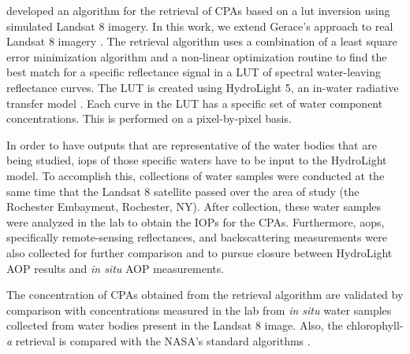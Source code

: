 \citet{Gerace:2013} developed an algorithm for the retrieval of CPAs based on a \acrfull{lut} inversion using simulated Landsat 8 imagery. In this work, we extend Gerace's approach to real Landsat 8 imagery \citep{Concha2013IGARSS}. The retrieval algorithm uses a combination of a least square error minimization algorithm and a non-linear optimization routine to find the best match for a specific reflectance signal in a LUT of spectral water-leaving reflectance curves. The LUT is created using HydroLight 5, an in-water radiative transfer model \citep{Mobley:2005}. Each curve in the LUT has a specific set of water component concentrations. This is performed on a pixel-by-pixel basis. 

In order to have outputs that are representative of the water bodies that are being studied, \acrfull{iops} of those specific waters have to be input to the HydroLight model. To accomplish this, collections of water samples were conducted at the same time that the Landsat 8 satellite passed over the area of study (the Rochester Embayment, Rochester, NY). After collection, these water samples were analyzed in the lab to obtain the IOPs for the CPAs. Furthermore, \acrfull{aops}, specifically remote-sensing reflectances, and backscattering measurements were also collected for further comparison and to pursue closure between HydroLight AOP results and {\it in situ} AOP measurements.

The concentration of CPAs obtained from the retrieval algorithm are validated by comparison with concentrations measured in the lab from {\it in situ} water samples collected from water bodies present in the Landsat 8 image. Also, the chlorophyll-{\it a} retrieval is compared with the NASA's standard algorithms \citep{OReilly1998_Chl,OReilly2000,Hu:2012fv}.